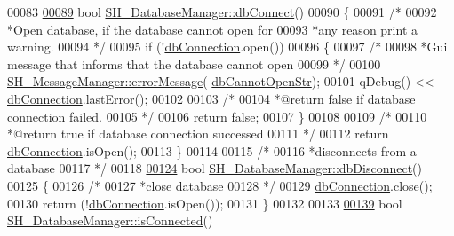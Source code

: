 \begin{DoxyCode}
00083 
\hypertarget{SH__DatabaseManager_8cpp_source_l00089}{}\hyperlink{classSH__DatabaseManager_aeb077fe5437f435c0cbe8d77d96dd846}{00089} \textcolor{keywordtype}{bool} \hyperlink{classSH__DatabaseManager_aeb077fe5437f435c0cbe8d77d96dd846}{SH\_DatabaseManager::dbConnect}()
00090 \{
00091     \textcolor{comment}{/*}
00092 \textcolor{comment}{            *Open database, if the database cannot open for}
00093 \textcolor{comment}{            *any reason print a warning.}
00094 \textcolor{comment}{            */}
00095     \textcolor{keywordflow}{if} (!\hyperlink{classSH__DatabaseManager_a9291f61c3abbba2c4f1567b1d8325f0e}{dbConnection}.open())
00096     \{
00097         \textcolor{comment}{/*}
00098 \textcolor{comment}{                 *Gui message that informs that the database cannot open}
00099 \textcolor{comment}{                 */}
00100         \hyperlink{classSH__MessageManager_acb5615cc90f198f4768da800a5d32362}{SH\_MessageManager::errorMessage}(
      \hyperlink{SH__DatabaseManager_8h_a19d48066a97c8a9a81827ccf23fd736f}{dbCannotOpenStr});
00101         qDebug() << \hyperlink{classSH__DatabaseManager_a9291f61c3abbba2c4f1567b1d8325f0e}{dbConnection}.lastError();
00102 
00103         \textcolor{comment}{/*}
00104 \textcolor{comment}{                 *@return false if database connection failed.}
00105 \textcolor{comment}{                 */}
00106         \textcolor{keywordflow}{return} \textcolor{keyword}{false};
00107     \}
00108 
00109     \textcolor{comment}{/*}
00110 \textcolor{comment}{             *@return true if database connection successed}
00111 \textcolor{comment}{             */}
00112     \textcolor{keywordflow}{return} \hyperlink{classSH__DatabaseManager_a9291f61c3abbba2c4f1567b1d8325f0e}{dbConnection}.isOpen();
00113 \}
00114 
00115 \textcolor{comment}{/*}
00116 \textcolor{comment}{         *disconnects from a database}
00117 \textcolor{comment}{         */}
00118 
\hypertarget{SH__DatabaseManager_8cpp_source_l00124}{}\hyperlink{classSH__DatabaseManager_a3716cf1a5f521cc49584dbcb2fab28bf}{00124} \textcolor{keywordtype}{bool} \hyperlink{classSH__DatabaseManager_a3716cf1a5f521cc49584dbcb2fab28bf}{SH\_DatabaseManager::dbDisconnect}()
00125 \{
00126     \textcolor{comment}{/*}
00127 \textcolor{comment}{             *close database}
00128 \textcolor{comment}{             */}
00129     \hyperlink{classSH__DatabaseManager_a9291f61c3abbba2c4f1567b1d8325f0e}{dbConnection}.close();
00130     \textcolor{keywordflow}{return} (!\hyperlink{classSH__DatabaseManager_a9291f61c3abbba2c4f1567b1d8325f0e}{dbConnection}.isOpen());
00131 \}
00132 
00133 
\hypertarget{SH__DatabaseManager_8cpp_source_l00139}{}\hyperlink{classSH__DatabaseManager_ab125b77320dca843740fc9928fbbe16f}{00139} \textcolor{keywordtype}{bool} \hyperlink{classSH__DatabaseManager_ab125b77320dca843740fc9928fbbe16f}{SH\_DatabaseManager::isConnected}()

\end{DoxyCode}
